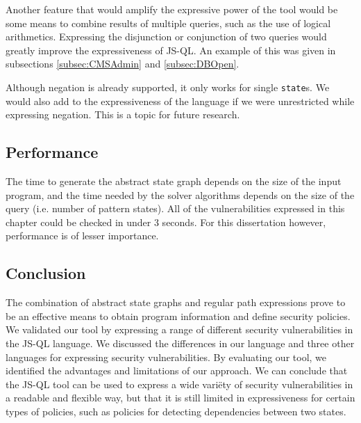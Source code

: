 Another feature that would amplify the expressive power of the tool would be some means to combine results of multiple queries, such as the use of logical arithmetics. Expressing the disjunction or conjunction of two queries would greatly improve the expressiveness of JS-QL. An example of this was given in subsections \ref{subsec:CMSAdmin} and \ref{subsec:DBOpen}. 


Although negation is already supported, it only works for single \texttt{state}s. We would also add to the expressiveness of the language if we were unrestricted while expressing negation. This is a topic for future research.

\subsection{Performance}
The time to generate the abstract state graph depends on the size of the input program, and the time needed by the solver algorithms depends on the size of the query (i.e. number of pattern states). All of the vulnerabilities expressed in this chapter could be checked in under 3 seconds. For this dissertation however, performance is of lesser importance.

\subsection{Conclusion}

The combination of abstract state graphs and regular path expressions prove to be an effective means to obtain program information and define security policies. We validated our tool by expressing a range of different security vulnerabilities in the JS-QL language. We discussed the differences in our language and three other languages for expressing security vulnerabilities. By evaluating our tool, we identified the advantages and limitations of our approach. We can conclude that the JS-QL tool can be used to express a wide variëty of security vulnerabilities in a readable and flexible way, but that it is still limited in expressiveness for certain types of policies, such as policies for detecting dependencies between two states.
  


